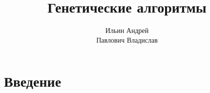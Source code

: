 \documentclass[11pt]{article}
\title{\textbf{Генетические алгоритмы}}
\author{Ильин Андрей\\Павлович Владислав}
\date{}
\begin{document}
\maketitle

\section{Введение}
\end{document}
